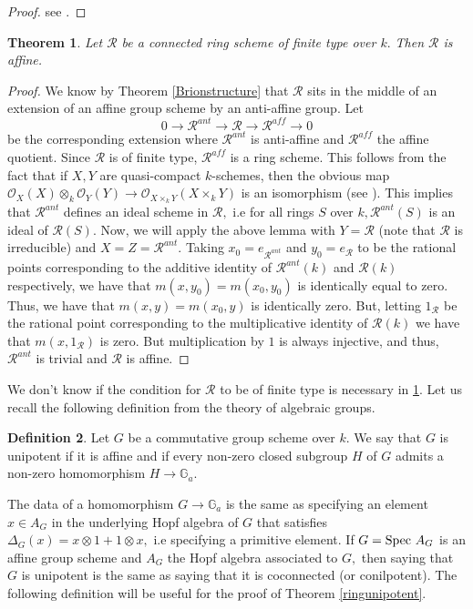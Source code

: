 \documentclass[a4paper, 12pt]{amsart}
\numberwithin{equation}{section}
\newtheorem{theorem}{Theorem}[section]
\theoremstyle{definition}
\newtheorem{definition}[theorem]{Definition}
\begin{document}
\begin{proof}
see \cite[Lemma 3.3.3.]{BrionStr}. \end{proof}
\begin{theorem} \label{ringaffine}
Let $\mathcal{R}$ be a connected ring scheme of finite type over $k.$ Then $\mathcal{R}$ is affine.
\end{theorem}
\begin{proof}
We know by Theorem \ref{Brionstructure} that $\mathcal{R}$ sits in the middle of an extension of an affine group scheme by an anti-affine group. Let
$$0 \rightarrow \mathcal{R}^{ant} \rightarrow \mathcal{R} \rightarrow \mathcal{R}^{aff} \rightarrow 0$$
be the corresponding extension where $\mathcal{R}^{ant}$ is anti-affine and $\mathcal{R}^{aff}$ the affine quotient. Since $\mathcal{R}$ is of finite type, $\mathcal{R}^{aff}$ is a ring scheme. This follows from the fact that if $X,Y$ are quasi-compact $k$-schemes, then the obvious map $\mathcal{O}_X(X) \otimes_k \mathcal{O}_Y(Y) \rightarrow \mathcal{O}_{X \times_k Y}(X \times_k Y)$ is an isomorphism (see \cite[Lemma 2.3.3.]{BrionStr}). This implies that $\mathcal{R}^{ant}$ defines an
ideal scheme in $\mathcal{R},$ i.e for all rings $S$ over $k, \mathcal{R}^{ant}(S)$ is an
ideal of $\mathcal{R}(S).$ Now, we will apply the above lemma with $Y=\mathcal{R}$ (note that $\mathcal{R}$ is irreducible) and
$X=Z=\mathcal{R}^{ant}.$ Taking $x_0=e_{\mathcal{R}^{ant}}$ and $y_0=e_{\mathcal{R}} $ to be the rational points corresponding to the additive identity of $\mathcal{R}^{ant}(k)$ and $\mathcal{R}(k)$ respectively, we have that
$m(x,y_0)=m(x_0,y_0)$ is identically equal to zero. Thus, we have that
$m(x,y)=m(x_0,y)$ is identically zero. But, letting $1_{\mathcal{R}}$ be the
rational point corresponding to the multiplicative identity of $\mathcal{R}(k)$ we
have that $m(x,1_{\mathcal{R}})$ is zero. But multiplication by $1$ is always
injective, and thus, $\mathcal{R}^{ant}$ is trivial and $\mathcal{R}$ is affine. \end{proof}
\noindent We don't know if the condition for $\mathcal{R}$ to be of finite type is necessary in \ref{ringaffine}. Let us recall the following definition from the theory of algebraic groups.
\begin{definition}
Let $G$ be a commutative group scheme over $k$. We say that $G$ is unipotent if it is affine and if every non-zero closed subgroup $H$ of $G$ admits a non-zero homomorphism $H \rightarrow \mathbb{G}_a.$
\end{definition}
\noindent The data of a homomorphism $G \rightarrow \mathbb{G}_a$ is the same as specifying an element $x \in A_G$ in the underlying Hopf algebra of $G$ that satisfies $\Delta_G(x) = x \otimes 1 + 1 \otimes x,$ i.e specifying a primitive element. If $G = \text{Spec } A_G$ is an affine group scheme and $A_G$ the Hopf algebra associated to $G,$ then saying that $G$ is unipotent is the same as saying that it is coconnected (or conilpotent). The following definition will be useful for the proof of Theorem \ref{ringunipotent}. 
\end{document}

